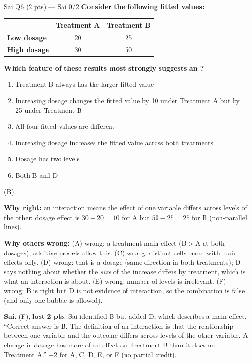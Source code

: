 \begin{qbox}{Sai Q6 (2 pts) --- Sai 0/2}
\textbf{Consider the following fitted values:}\par
\begin{tabular}{@{}lcc@{}}\toprule
 & \textbf{Treatment A} & \textbf{Treatment B}\\\midrule
\textbf{Low dosage} & 20 & 25\\
\textbf{High dosage} & 30 & 50\\\bottomrule
\end{tabular}\par
\textbf{Which feature of these results most strongly suggests an ?}
\begin{enumerate}[label=(\Alph*),leftmargin=1.6em,itemsep=0pt]
\item Treatment B always has the larger fitted value
\item Increasing dosage changes the fitted value by 10 under Treatment A but by 25 under Treatment B
\item All four fitted values are different
\item Increasing dosage increases the fitted value across both treatments
\item Dosage has two levels
\item Both B and D
\end{enumerate}
\ans (B).
\par\textbf{Why right:} an interaction means the effect of one variable differs across levels of the other: dosage effect is $30-20=10$ for A but $50-25=25$ for B (non-parallel lines). 
\par\textbf{Why others wrong:}
(A) wrong: a treatment main effect (B$>$A at both dosages); additive models allow this.
(C) wrong: distinct cells occur with main effects only.
(D) wrong: that is a dosage  (same direction in both treatments); D says nothing about whether the \emph{size} of the increase differs by treatment, which is what an interaction is about.
(E) wrong: number of levels is irrelevant.
(F) wrong: B is right but D is not evidence of interaction, so the combination is false (and only one bubble is allowed).
\par\textbf{\color{dblue}Sai:} (F), \textbf{lost 2 pts}. Sai identified B but added D, which describes a main effect. \grader ``Correct answer is B. The definition of an interaction is that the relationship between one variable and the outcome differs across levels of the other variable. A change in dosage has more of an effect on Treatment B than it does on Treatment A.'' $-$2 for A, C, D, E, or F (no partial credit).
\end{qbox}

